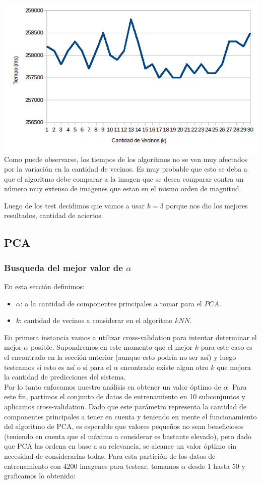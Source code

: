 \includegraphics[scale=0.55]{nuevosResultados/knn/knntemp.png}\\

Como puede observarse, los tiempos de los algoritmos no se ven muy afectados por la variación en la cantidad de vecinos. Es muy probable que esto se deba a que el algoritmo debe comparar a la imagen que se desea comparar contra un número muy extenso de imagenes que estan en el mismo orden de magnitud. 
\completar

Luego de los test decidimos que vamos a usar $k=3$ porque nos dio los mejores resultados, cantidad de aciertos.

\subsection{PCA}
\subsubsection{Busqueda del mejor valor de $\alpha$}
En esta sección definimos:
\begin{itemize}
	\item $\alpha$: a la cantidad de componentes principales a tomar para el $PCA$.
	\item $k$: cantidad de vecinos a considerar en el algoritmo $kNN$.
\end{itemize}
En primera instancia vamos a utilizar cross-validation para intentar determinar el mejor $\alpha$ posible. Supondremos en este momento que el mejor $k$ para este caso es el encontrado en la sección anterior (aunque esto podría no ser así) y luego testeamos si esto es así o si para el $\alpha$ encontrado existe algun otro $k$ que mejora la cantidad de predicciones del sistema.
\\
Por lo tanto enfocamos nuestro análisis en obtener un valor óptimo de $\alpha$. Para este fin, partimos el conjunto de datos de entrenamiento en 10 subconjuntos y aplicamos cross-validation. Dado que este parámetro representa la cantidad de componentes principales a tener en cuenta y teniendo en mente el funcionamiento del algoritmo de PCA, es esperable que valores pequeños no sean beneficiosos (teniendo en cuenta que el máximo a considerar es bastante elevado), pero dado que PCA las ordena en base a su relevancia, se alcance un valor óptimo sin necesidad de considerarlas todas. Para esta partición de los datos de entrenamiento con 4200 imagenes para testear, tomamos $\alpha$ desde $1$ hasta $50$ y graficamos lo obtenido:

